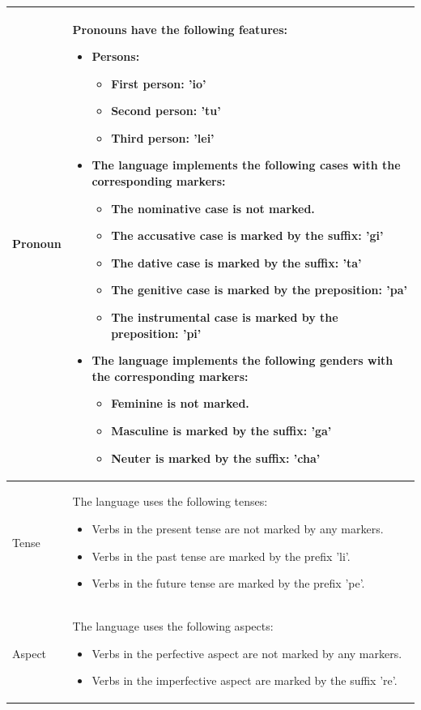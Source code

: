 \begin{longtable}{|l|p{10cm}|}
Pronoun & Pronouns have the following features:
\begin{itemize}
    \item Persons:
    \begin{itemize}
        \item First person: 'io'
        \item Second person: 'tu'
        \item Third person: 'lei'
    \end{itemize}
    \item The language implements the following cases with the corresponding markers:
    \begin{itemize}
        \item The nominative case is not marked.
        \item The accusative case is marked by the suffix: 'gi'
        \item The dative case is marked by the suffix: 'ta'
        \item The genitive case is marked by the preposition: 'pa'
        \item The instrumental case is marked by the preposition: 'pi'
    \end{itemize}
    \item The language implements the following genders with the corresponding markers:
    \begin{itemize}
        \item Feminine is not marked.
        \item Masculine is marked by the suffix: 'ga'
        \item Neuter is marked by the suffix: 'cha'
    \end{itemize}
\end{itemize} \\
\hline

Tense & The language uses the following tenses:
\begin{itemize}
    \item Verbs in the present tense are not marked by any markers.
    \item Verbs in the past tense are marked by the prefix 'li'.
    \item Verbs in the future tense are marked by the prefix 'pe'.
\end{itemize} \\
\hline

Aspect & The language uses the following aspects:
\begin{itemize}
    \item Verbs in the perfective aspect are not marked by any markers.
    \item Verbs in the imperfective aspect are marked by the suffix 're'.
\end{itemize} \\
\hline


\end{longtable}
